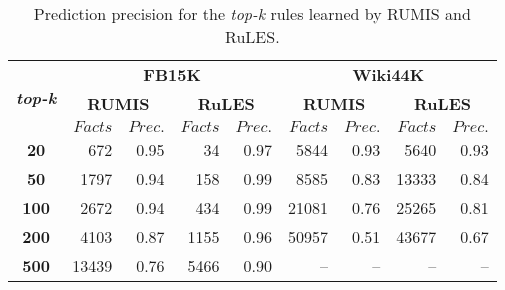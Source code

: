 \begin{table}[t]
\centering
\begin{tabular}{|c|r r|r r|r r|r r|}
 \hline
 \multirow{3}{*}{\textbf{\textit{top-k}}}&\multicolumn{4}{|c|}{\textbf{FB15K}} & \multicolumn{4}{|c|}{\textbf{Wiki44K}}\\
 \cline{2-9}&\multicolumn{2}{|c|}{\textbf{RUMIS}}&\multicolumn{2}{|c|}{\textbf{RuLES}}&\multicolumn{2}{|c|}{\textbf{RUMIS}}&\multicolumn{2}{|c|}{\textbf{RuLES}} \\
 & $Facts$ & $Prec.$ & $Facts$ & $Prec.$& $Facts$ & $Prec.$& $Facts$ & $Prec.$ \\
 \hline
\textbf{20} & 672 & 0.95 & 34 & 0.97 & 5844 & 0.93 & 5640 & 0.93 \\
\textbf{50} & 1797 & 0.94 & 158 & 0.99 & 8585 & 0.83 & 13333 & 0.84 \\
\textbf{100} & 2672 & 0.94 & 434 & 0.99 & 21081 & 0.76 & 25265 & 0.81 \\
\textbf{200} & 4103 & 0.87 & 1155 & 0.96 & 50957 & 0.51 & 43677 & 0.67 \\
\textbf{500} & 13439 & 0.76 & 5466 & 0.90 & -- & -- & -- & -- \\
\hline
\end{tabular}
\caption{Prediction precision for the \textit{top-k} rules learned by RUMIS and RuLES.}
\label{table:exception_prediction_result}
\end{table}